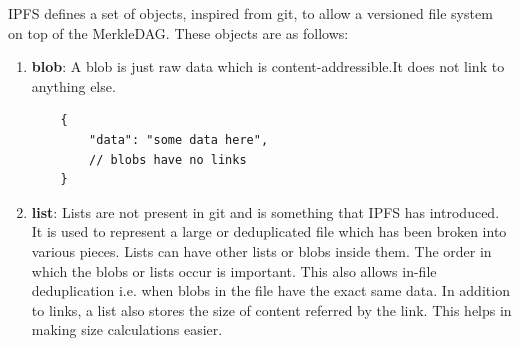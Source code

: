 IPFS defines a set of objects, inspired from git, to allow a versioned file system on top of the MerkleDAG. These objects are as follows:

\begin{enumerate}
    \item \textbf{blob}: A blob is just raw data which is content-addressible.It does not link to anything else.
    \begin{verbatim}
    {
        "data": "some data here",
        // blobs have no links
    }
    \end{verbatim}
    \item \textbf{list}: Lists are not present in git and is something that IPFS has introduced. It is used to represent a large or deduplicated file which has been broken into various pieces. Lists can have other lists or blobs inside them. The order in which the blobs or lists occur is important. This also allows in-file deduplication i.e. when blobs in the file have the exact same data. In addition to links, a list also stores the size of content referred by the link. This helps in making size calculations easier.
    

\end{enumerate}
